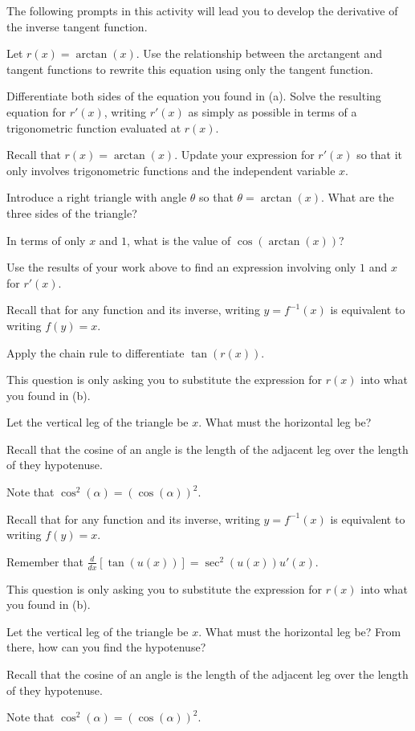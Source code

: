 \begin{activity} \label{A:2.6.2}  
The following prompts in this activity will lead you to develop the derivative of the inverse tangent function.
\ba
	\item Let $r(x) = \arctan(x)$.  Use the relationship between the arctangent and tangent functions to rewrite this equation using only the tangent function.
	\item Differentiate both sides of the equation you found in (a).  Solve the resulting equation for $r'(x)$, writing $r'(x)$ as simply as possible in terms of a trigonometric function evaluated at $r(x)$.
	\item Recall that $r(x) = \arctan(x)$.  Update your expression for $r'(x)$ so that it only involves trigonometric functions and the independent variable $x$.
	\item Introduce a right triangle with angle $\theta$ so that $\theta = \arctan(x)$.  What are the three sides of the triangle?
	\item In terms of only $x$ and $1$, what is the value of $\cos(\arctan(x))$?
	\item Use the results of your work above to find an expression involving only $1$ and $x$ for $r'(x)$.
\ea
\end{activity}
\begin{smallhint}
\ba
	\item Recall that for any function and its inverse, writing $y = f^{-1}(x)$ is equivalent to writing $f(y) = x$.
	\item Apply the chain rule to differentiate $\tan(r(x))$.
	\item This question is only asking you to substitute the expression for $r(x)$ into what you found in (b).
	\item Let the vertical leg of the triangle be $x$.  What must the horizontal leg be?
	\item Recall that the cosine of an angle is the length of the adjacent leg over the length of they hypotenuse.
	\item Note that $\cos^2(\alpha) = (\cos(\alpha))^2.$
\ea
\end{smallhint}
\begin{bighint}
\ba
	\item Recall that for any function and its inverse, writing $y = f^{-1}(x)$ is equivalent to writing $f(y) = x$.
	\item Remember that $\frac{d}{dx}[\tan(u(x))] = \sec^2(u(x)) u'(x)$.
	\item This question is only asking you to substitute the expression for $r(x)$ into what you found in (b).
	\item Let the vertical leg of the triangle be $x$.  What must the horizontal leg be?  From there, how can you find the hypotenuse?
	\item Recall that the cosine of an angle is the length of the adjacent leg over the length of they hypotenuse.
	\item Note that $\cos^2(\alpha) = (\cos(\alpha))^2.$
\ea\end{bighint}
